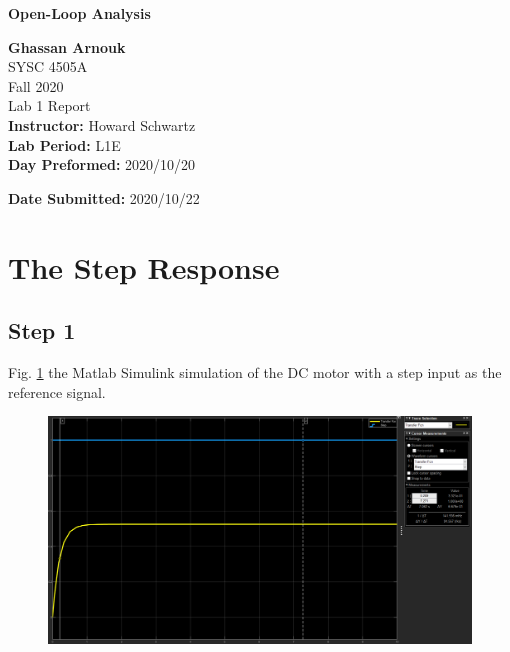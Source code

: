 \documentclass[hidelinks]{article}
\begin{document}
	\begin{titlepage}
		\begin{center}
			\vspace{1cm}
			{\LARGE\textbf{Open-Loop Analysis}}
			
			\vspace{1.5cm}
			\textbf{\large Ghassan Arnouk}\\
			
			\vspace{1cm}
			\large SYSC 4505A\\
			\large Fall 2020\\
			\large Lab 1 Report\\
			
			
			\vspace{2cm}
			\textbf{Instructor:} Howard Schwartz\\
			
			
			\vspace{1cm}
			\textbf{Lab Period:} L1E\\
			
			\vspace{0.1cm}
			\textbf{Day Preformed:} 2020/10/20
			
			\vspace{1cm}
			\textbf{Date Submitted:} 2020/10/22\\			
		\end{center}
	\end{titlepage}
	
	\pagebreak
	
	\tableofcontents
	\pagebreak
	
	\listoftables
	\pagebreak
	
	\listoffigures
	\pagebreak
	
	\section{The Step Response}
	\subsection{Step 1}
	Fig. \ref{f1} the Matlab Simulink simulation of the DC motor with a step input as the reference signal.
	\begin{figure}[htbp]
		\centering
		\includegraphics[width=0.7\textheight]{1_step1.1.png}
		\label{f1}
	\end{figure}
\end{document}
